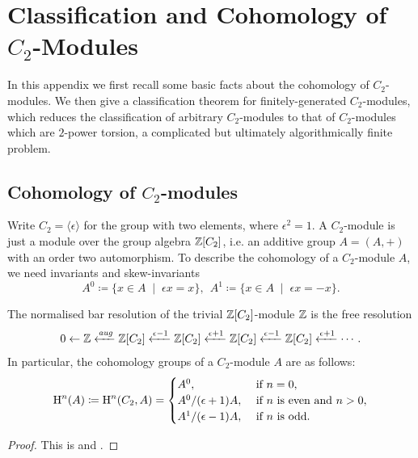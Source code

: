 \chapter{Classification and Cohomology of $C_2$-Modules}\label{appendix:classandcohomC2modules}

In this appendix we first recall some basic facts about the cohomology of $C_2$-modules. We then give a classification theorem for finitely-generated $C_2$-modules, which reduces the classification of arbitrary $C_2$-modules to that of $C_2$-modules which are $2$-power torsion, a complicated but ultimately algorithmically finite problem.


\section{Cohomology of $C_2$-modules}\label{sect:cohomC2modules}
Write $C_2 = \langle \epsilon \rangle$ for the group with two elements, where $\epsilon^2 = 1$. A $C_2$-module is just a module over the group algebra ${\mathbb Z} [C_2]$, i.e. an additive group $A=(A,+)$ with an order two automorphism. 
To describe the cohomology of a $C_2$-module $A$, we need invariants and skew-invariants
\[
A^0 \coloneqq \{ x\in A \;\mid\; \epsilon x = x \}, \ \
A^1 \coloneqq \{ x\in A \;\mid\; \epsilon x = -x \}.
\]
\begin{prop} \label{prop:C2cohomology}
  The normalised bar resolution of the trivial ${\mathbb Z}[C_2]$-module ${\mathbb Z}$ is the free resolution
  \[
  0 \leftarrow {\mathbb Z} \xleftarrow{\emph{\text{aug}}} {\mathbb Z}[C_2] \xleftarrow{\epsilon - 1} {\mathbb Z}[C_2] \xleftarrow{\epsilon + 1}  {\mathbb Z}[C_2] \xleftarrow{\epsilon - 1} {\mathbb Z}[C_2] \xleftarrow{\epsilon + 1} \cdots .
  \]
In particular, the cohomology groups of a $C_2$-module $A$ are as follows:
\[
\mathrm{H}^{n}(A) \coloneqq \mathrm{H}^{n}(C_2, A) =
\begin{cases}
  A^0, & \mbox{ if } n=0, \\
  A^0/(\epsilon + 1) A, & \mbox{ if } n \mbox{ is even and } n>0, \\
  A^1/(\epsilon - 1) A, & \mbox{ if } n \mbox{ is odd}.
\end{cases}
\]
\end{prop}

\begin{proof}
  This is \cite[Ex.\ 6.5.2(4)]{Weib} and \cite[Thm.\ 6.2.2]{Weib}.
\end{proof}

